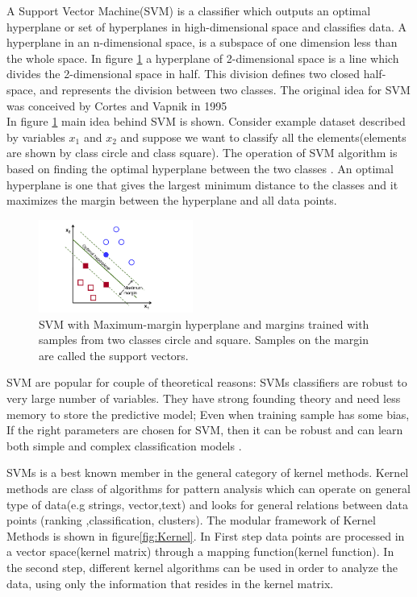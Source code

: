 A Support Vector Machine(SVM) is a classifier which outputs an optimal hyperplane or set of hyperplanes in high-dimensional space and classifies data. A hyperplane in an n-dimensional space, is a subspace of one dimension less than the whole space. In figure \ref{fig:SVM} a hyperplane of 2-dimensional space is a line which divides the 2-dimensional space in half. This division defines two closed half-space, and represents the division between two classes. The original idea for SVM was conceived by Cortes and Vapnik in 1995 \cite{cortes1995support} \\
In figure \ref{fig:SVM} main idea behind SVM is shown. Consider example dataset described by variables $x_1$ and $x_2$ and suppose we want to classify all the elements(elements are shown by class circle and class square). The operation of SVM algorithm is based on finding the optimal hyperplane between the two classes \cite{opencv_library}. An optimal hyperplane is one that gives the largest minimum distance to the classes and it maximizes the margin between the hyperplane and all data points. %

\begin{figure}[H]
    \includegraphics[width=0.45\textwidth]{./img/SVM.png}
     \caption{\footnotesize{SVM with Maximum-margin hyperplane and margins trained with samples from two classes circle and square. Samples on the margin are called the support vectors.\cite{wiki:SVM}
 }}
    \label{fig:SVM}
\end{figure}


SVM are popular for couple of theoretical reasons: SVMs classifiers are robust to very large number of variables. They have strong founding theory and need less memory to store the predictive model; Even when training sample has some bias, If the right parameters are chosen for SVM, then it can be robust\cite{auria2008support} and can learn both simple and complex classification models \cite{cristianini2000}. 


SVMs is a best known member in the general category of kernel methods. Kernel methods are class of algorithms for pattern analysis which can operate on general type of data(e.g strings, vector,text) and looks for general relations between data points (ranking ,classification, clusters). The modular framework of Kernel Methods is shown in figure\ref{fig:Kernel}. In First step data points are processed in a vector space(kernel matrix) through a mapping function(kernel function). In the second step, different kernel algorithms can be used in order to analyze the data, using only the information that resides in the kernel matrix. \cite{shawe2004kernel}\\

